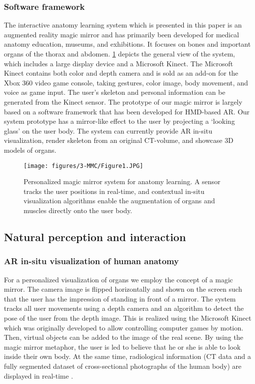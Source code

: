 \subsubsection{Software framework}
The interactive anatomy learning system which is presented in this paper is an augmented reality magic mirror and has primarily been developed for medical anatomy education, museums, and exhibitions. It focuses on bones and important organs of the thorax and abdomen. \figurename{\ref{fig:3-MMC:fingure1}} depicts the general view of the system, which includes a large display device and a Microsoft Kinect. The Microsoft Kinect contains both color and depth camera and is sold as an add-on for the Xbox 360 video game console, taking gestures, color image, body movement, and voice as game input. The user's skeleton and personal information can be generated from the Kinect sensor. The prototype of our magic mirror is largely based on a software framework that has been developed for HMD-based AR. Our system prototype has a mirror-like effect to the user by projecting a `looking glass' on the user body. The system can currently provide AR in-situ visualization, render skeleton from an original CT-volume, and showcase 3D models of organs.
\begin{figure}[ht]
	\centering
	\texttt{[image: figures/3-MMC/Figure1.JPG]}
	\label{fig:3-MMC:fingure1}
	\caption{Personalized magic mirror system for anatomy learning. A sensor tracks the user positions in real-time, and contextual in-situ visualization algorithms enable the augmentation of organs and muscles directly onto the user body.}
\end{figure}

\subsection{Natural perception and interaction}
\subsubsection{AR in-situ visualization of human anatomy}
For a personalized visualization of organs we employ the concept of a magic mirror. The camera image is flipped horizontally and shown on the screen such that the user has the impression of standing in front of a mirror. The system tracks all user movements using a depth camera and an algorithm to detect the pose of the user from the depth image. This is realized using the Microsoft Kinect which was originally developed to allow controlling computer games by motion. Then, virtual objects can be added to the image of the real scene. By using the magic mirror metaphor, the user is led to believe that he or she is able to look inside their own body. At the same time, radiological information (CT data and a fully segmented dataset of cross-sectional photographs of the human body) are displayed in real-time \cite{Blum2012}.

